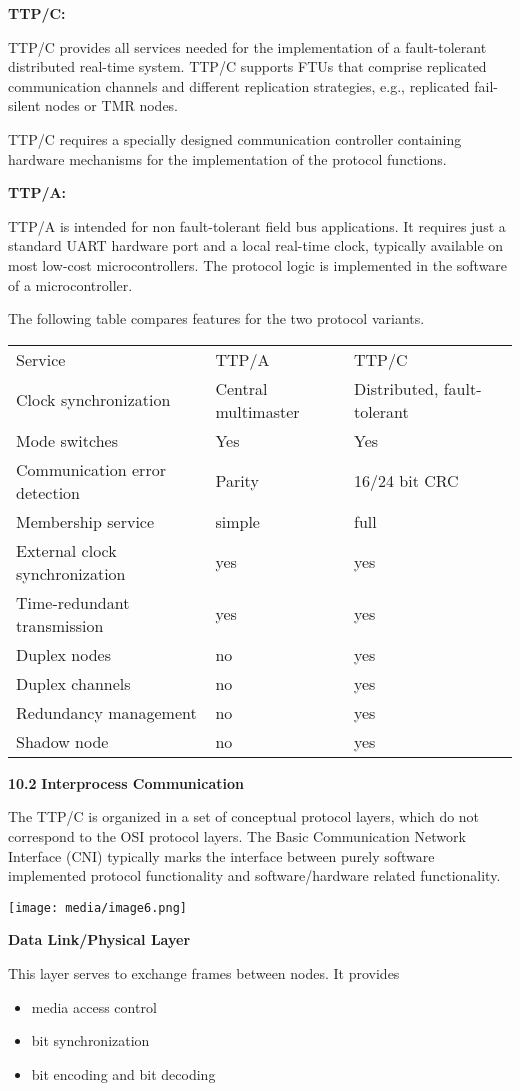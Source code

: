 \textbf{TTP/C:}

TTP/C provides all services needed for the implementation of a
fault-tolerant distributed real-time system. TTP/C supports FTUs that
comprise replicated communication channels and different replication
strategies, e.g., replicated fail-silent nodes or TMR nodes.

TTP/C requires a specially designed communication controller containing
hardware mechanisms for the implementation of the protocol functions.

\textbf{TTP/A:}

TTP/A is intended for non fault-tolerant field bus applications. It
requires just a standard UART hardware port and a local real-time clock,
typically available on most low-cost microcontrollers. The protocol
logic is implemented in the software of a microcontroller.

The following table compares features for the two protocol variants.

\begin{longtable}[c]{@{}lll@{}}
\toprule
Service & TTP/A & TTP/C\tabularnewline
Clock synchronization & Central multimaster & Distributed,
fault-tolerant\tabularnewline
Mode switches & Yes & Yes\tabularnewline
Communication error detection & Parity & 16/24 bit CRC\tabularnewline
Membership service & simple & full\tabularnewline
External clock synchronization & yes & yes\tabularnewline
Time-redundant transmission & yes & yes\tabularnewline
Duplex nodes & no & yes\tabularnewline
Duplex channels & no & yes\tabularnewline
Redundancy management & no & yes\tabularnewline
Shadow node & no & yes\tabularnewline
\bottomrule
\end{longtable}

\textbf{10.2} \protect\hypertarget{teil3}{}{}\textbf{Interprocess
Communication }

The TTP/C is organized in a set of conceptual protocol layers, which do
not correspond to the OSI protocol layers. The Basic Communication
Network Interface (CNI) typically marks the interface between purely
software implemented protocol functionality and software/hardware
related functionality.

\texttt{[image: media/image6.png]}

\textbf{Data Link/Physical Layer}

This layer serves to exchange frames between nodes. It provides

\begin{itemize}
\item
  media access control
\item
  bit synchronization
\item
  bit encoding and bit decoding
\end{itemize}

